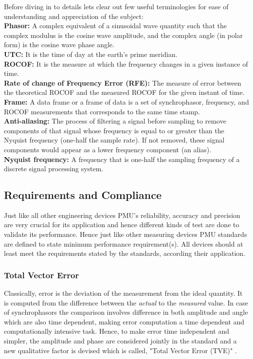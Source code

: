 Before diving in to details lets clear out few useful terminologies for ease of understanding and appreciation of the subject:\\
\textbf{Phasor:} A complex equivalent of a sinusoidal wave quantity such that the complex modulus is the cosine wave amplitude, and the complex angle (in polar form) is the cosine wave phase angle.\\
\textbf{UTC:} It is the time of day at the earth's prime meridian.\\
\textbf{ROCOF:} It is the measure at which the frequency changes in a given instance of time.\\
\textbf{Rate of change of Frequency Error (RFE):} The measure of error between the theoretical ROCOF and the measured ROCOF for the given instant of time.\\
\textbf{Frame:} A data frame or a frame of data is a set of synchrophasor, frequency, and ROCOF measurements that corresponds to the same time stamp.\\
\textbf{Anti-aliasing:} The process of filtering a signal before sampling to remove components of that signal whose frequency is equal to or greater than the Nyquist frequency (one-half the sample rate). If not removed, these signal components would appear as a lower frequency component (an alias).\\
\textbf{Nyquist frequency:} A frequency that is one-half the sampling frequency of a discrete signal processing
system.\\

\subsection{Requirements and Compliance}
Just like all other engineering devices PMU's reliability, accuracy  and precision are very crucial for its application and hence different kinds of test are done to validate its performance. Hence just like other measuring devices PMU standards are defined to state minimum performance requirement(s). All devices should at least meet the requirements stated by the standards, according their application.


\subsubsection{Total Vector Error}
Classically, error is the deviation of the measurement from the ideal quantity. It is computed from the difference between the \emph{actual} to the \emph{measured} value. In case of synchrophasors the comparison involves difference in both amplitude and angle which are also time dependent, making error computation a time dependent and computationally intensive task. Hence, to make error time independent and simpler, the amplitude and phase are considered jointly in the standard and a new qualitative factor is devised which is called, "Total Vector Error (TVE)" \cite{c37.118}.  
	
